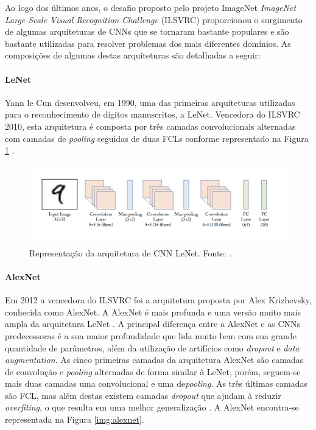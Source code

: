 Ao logo dos últimos anos, o desafio proposto pelo projeto ImageNet  \emph{ImageNet Large Scale Visual Recognition Challenge} (ILSVRC) proporcionou o surgimento de algumas arquiteturas de CNNs que se tornaram bastante populares e são bastante utilizadas para resolver problemas dos mais diferentes domínios. As composições de algumas destas arquiteturas são detalhadas a seguir:

\paragraph{LeNet} Yann le Cun desenvolveu, em 1990, uma das primeiras arquiteturas utilizadas para o reconhecimento de dígitos manuscritos, a LeNet. Vencedora do ILSVRC 2010, esta arquitetura é composta por três camadas convolucionais alternadas com camadas de \textit{pooling} seguidas de duas FCLs conforme representado na Figura \ref{img:lenet} \cite{ref:sewak,ref:khan}.

\begin{figure}[!ht]
	\centering
	\includegraphics[width=1\textwidth]{./img/lenet}
	\caption{Representação da arquitetura de CNN LeNet. Fonte: \cite{ref:khan}.}
	\label{img:lenet}
\end{figure}


\paragraph{AlexNet} Em 2012 a vencedora do ILSVRC foi a arquitetura proposta por Alex Krizhevsky, conhecida como AlexNet. A AlexNet é mais profunda e uma versão muito mais ampla da arquitetura LeNet \cite{ref:satapathy}. A principal diferença entre a AlexNet e as CNNs predecessoras é a sua maior profundidade que lida muito bem com sua grande quantidade de parâmetros, além da utilização de artifícios como \textit{dropout} e \textit{data augmentation}. As cinco primeiras camadas da arquitetura AlexNet são camadas de convolução e \textit{pooling} alternadas de forma similar à LeNet, porém, seguem-se mais duas camadas uma convolucional e uma de\textit{pooling}. As três últimas camadas são FCL, mas além destas existem camadas \textit{dropout} que ajudam à reduzir \textit{overfiting}, o que resulta em uma melhor generalização \cite{ref:khan}. A AlexNet encontra-se representada na Figura \ref{img:alexnet}.

